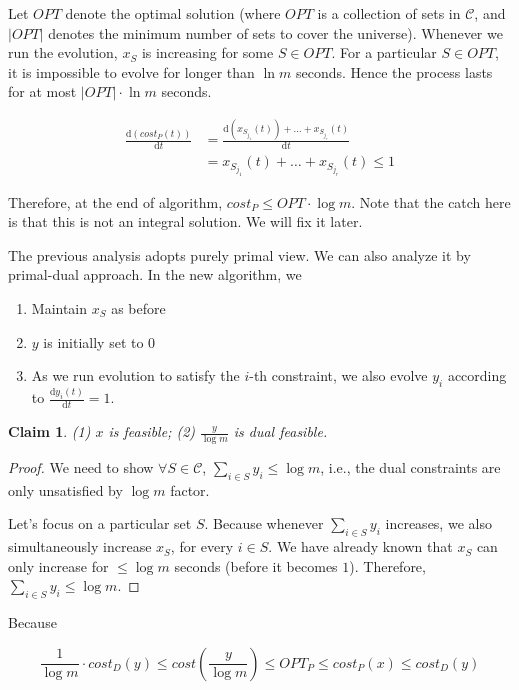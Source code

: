 \documentclass[11pt]{article}
\newtheorem{claim}[theorem]{Claim}
\begin{document}
Let $OPT$ denote the optimal solution (where $OPT$ is a collection of sets in $\mathcal{C}$, and $|OPT|$ denotes the minimum number of sets to cover the universe).  Whenever we run the evolution, $x_S$ is increasing for some $S\in OPT$. For a particular $S \in OPT$, it is impossible to evolve for longer than $\ln m$ seconds. Hence the process lasts for at most $|OPT|\cdot \ln m$ seconds. 

\begin{equation}
\begin{split}
\frac{\mathrm{d}(cost_P(t))}{\mathrm{d}t} &= \frac{\mathrm{d}(x_{S_{j_1}}{(t)})+\ldots+x_{S_{j_r}}{(t)}}{\mathrm{d}t} \\
&=x_{S_{j_1}}(t)+\ldots+x_{S_{j_r}}(t) \le1
\end{split}
\end{equation}

Therefore, at the end of algorithm, $cost_P\le OPT \cdot \log m$. Note that the catch here is that this is not an integral solution. We will fix it later. 

The previous analysis adopts purely primal view. We can also analyze it by primal-dual approach. In the new algorithm, we 
\begin{enumerate}
\item Maintain $x_S$ as before
\item $y$ is initially set to $0$
\item As we run evolution to satisfy the $i$-th constraint, we also evolve $y_i$ according to $\frac{\mathrm{d}y_i(t)}{\mathrm{d}t}=1$.
\end{enumerate}

\begin{claim}
(1) $x$ is feasible; (2) $\frac{y}{\log m}$ is dual feasible.
\end{claim}
\begin{proof}
We need to show $\forall S\in \mathcal{C}$, $\sum_{i\in S} {y_i}\le \log m$, i.e., the dual constraints are only unsatisfied by $\log m$ factor. 

Let's focus on a particular set $S$. Because whenever $\sum_{i\in S}{y_i}$ increases, we also simultaneously increase $x_S$, for every $i\in S$. We have already known that $x_S$ can only increase for $\le \log m$ seconds (before it becomes $1$). Therefore, $\sum_{i\in S}{y_i}\le \log m$.
\end{proof}

Because 

$$\frac{1}{\log m}\cdot cost_D(y) \le cost(\frac{y}{\log m})\le OPT_P\le cost_P(x)\le cost_D(y)$$
\end{document}
